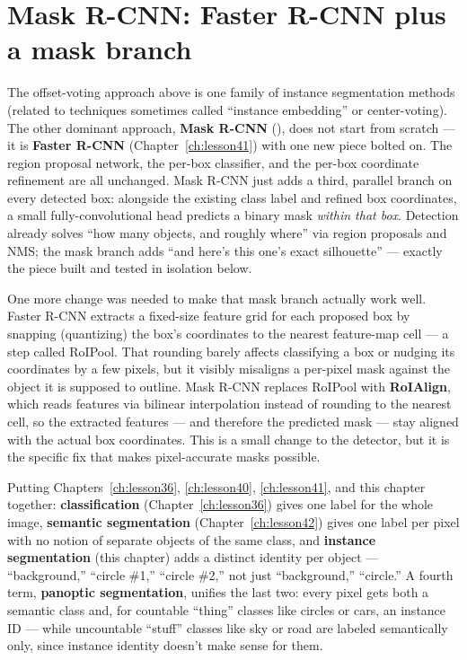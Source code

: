 \section{Mask R-CNN: Faster R-CNN plus a mask branch}

The offset-voting approach above is one family of instance segmentation methods (related to techniques sometimes called ``instance embedding'' or center-voting). The other dominant approach, \textbf{Mask R-CNN} (), does not start from scratch --- it is \textbf{Faster R-CNN} (Chapter~\ref{ch:lesson41}) with one new piece bolted on. The region proposal network, the per-box classifier, and the per-box coordinate refinement are all unchanged. Mask R-CNN just adds a third, parallel branch on every detected box: alongside the existing class label and refined box coordinates, a small fully-convolutional head predicts a binary mask \emph{within that box}. Detection already solves ``how many objects, and roughly where'' via region proposals and NMS; the mask branch adds ``and here's this one's exact silhouette'' --- exactly the piece built and tested in isolation below.

One more change was needed to make that mask branch actually work well. Faster R-CNN extracts a fixed-size feature grid for each proposed box by snapping (quantizing) the box's coordinates to the nearest feature-map cell --- a step called RoIPool. That rounding barely affects classifying a box or nudging its coordinates by a few pixels, but it visibly misaligns a per-pixel mask against the object it is supposed to outline. Mask R-CNN replaces RoIPool with \textbf{RoIAlign}, which reads features via bilinear interpolation instead of rounding to the nearest cell, so the extracted features --- and therefore the predicted mask --- stay aligned with the actual box coordinates. This is a small change to the detector, but it is the specific fix that makes pixel-accurate masks possible.

Putting Chapters~\ref{ch:lesson36}, \ref{ch:lesson40}, \ref{ch:lesson41}, and this chapter together: \textbf{classification} (Chapter~\ref{ch:lesson36}) gives one label for the whole image, \textbf{semantic segmentation} (Chapter~\ref{ch:lesson42}) gives one label per pixel with no notion of separate objects of the same class, and \textbf{instance segmentation} (this chapter) adds a distinct identity per object --- ``background,'' ``circle \#1,'' ``circle \#2,'' not just ``background,'' ``circle.'' A fourth term, \textbf{panoptic segmentation}, unifies the last two: every pixel gets both a semantic class and, for countable ``thing'' classes like circles or cars, an instance ID --- while uncountable ``stuff'' classes like sky or road are labeled semantically only, since instance identity doesn't make sense for them.

